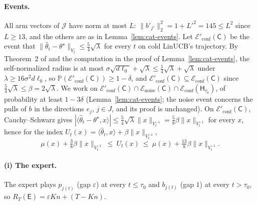 \documentclass{article}
\theoremstyle{definition}
\theoremstyle{remark}
\newcommand{\Prb}{\mathbb{P}}
\newcommand{\eps}{\varepsilon}
\theoremstyle{remark}
\newcommand{\Cold}{\mathsf{C}}
\newcommand{\Exp}{\mathsf{E}}
\newcommand{\Hyb}{\mathsf{H}}
\begin{document}
\paragraph{Events.}
All arm vectors of $\mathcal J$ have norm at most $L$: $\|b'_{j'}\|_2^2=1+L'^2=145\le L^2$
since $L\ge13$, and the others are as in Lemma~\ref{lem:cat-events}. Let
$\mathcal E'_{\mathrm{conf}}(\Cold)$ be the event that
$\|\widehat\theta_t-\theta^\star\|_{V_t}\le\tfrac54\sqrt\lambda$ for every $t$
on cold LinUCB's trajectory. By Theorem~2 of \cite{abbasi2011improved} and
the computation in the proof of Lemma~\ref{lem:cat-events}, the
self-normalized radius is at most $\sigma\sqrt{d\ell_0}+\sqrt\lambda\le\tfrac14\sqrt\lambda+\sqrt\lambda$
under $\lambda\ge16\sigma^2d\ell_0$, so
$\Prb(\mathcal E'_{\mathrm{conf}}(\Cold))\ge1-\delta$, and
$\mathcal E'_{\mathrm{conf}}(\Cold)\subseteq\mathcal E_{\mathrm{conf}}(\Cold)$
since $\tfrac54\sqrt\lambda\le\beta=2\sqrt\lambda$. We work on
$\mathcal E'_{\mathrm{conf}}(\Cold)\cap\mathcal E_{\mathrm{noise}}(\Cold)\cap\mathcal E_{\mathrm{conf}}(\Hyb_{\tau_0})$,
of probability at least $1-3\delta$ (Lemma~\ref{lem:cat-events}; the noise
event concerns the pulls of $b$ in the directions $e_j$, $j\in J$, and its
proof is unchanged). On $\mathcal E'_{\mathrm{conf}}(\Cold)$, Cauchy--Schwarz
gives $|\langle\widehat\theta_t-\theta^\star,x\rangle|\le\tfrac54\sqrt\lambda\|x\|_{V_t^{-1}}=\tfrac58\beta\|x\|_{V_t^{-1}}$
for every $x$, hence for the index $U_t(x)=\langle\widehat\theta_t,x\rangle+\beta\|x\|_{V_t^{-1}}$,
\begin{equation}
\label{eq:sharp-index}
\mu(x)+\tfrac38\beta\|x\|_{V_t^{-1}}\ \le\ U_t(x)\ \le\ \mu(x)+\tfrac{13}8\beta\|x\|_{V_t^{-1}} .
\end{equation}

\paragraph{(i) The expert.}
The expert plays $p_{j(t)}$ (gap $\eps$) at every $t\le\tau_0$ and $b_{j(t)}$
(gap $1$) at every $t>\tau_0$, so $R_T(\Exp)=\eps Kn+(T-Kn)$.
\end{document}
